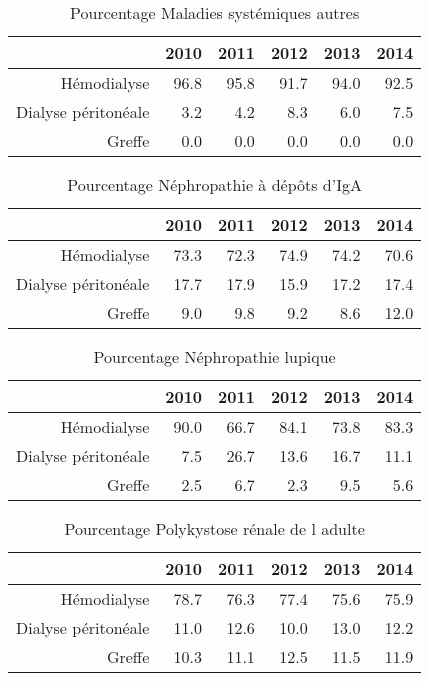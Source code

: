 \documentclass[11pt,a4paper]{article}\usepackage[]{graphicx}\usepackage[]{color}
\begin{document}
\begin{table}[H]
\centering
\begin{tabular}{rrrrrr}
  \hline
 & 2010 & 2011 & 2012 & 2013 & 2014 \\ 
  \hline
Hémodialyse & 96.8 & 95.8 & 91.7 & 94.0 & 92.5 \\ 
  Dialyse péritonéale & 3.2 & 4.2 & 8.3 & 6.0 & 7.5 \\ 
  Greffe & 0.0 & 0.0 & 0.0 & 0.0 & 0.0 \\ 
   \hline
\end{tabular}
\caption{Pourcentage Maladies systémiques autres} 
\end{table}
\begin{table}[H]
\centering
\begin{tabular}{rrrrrr}
  \hline
 & 2010 & 2011 & 2012 & 2013 & 2014 \\ 
  \hline
Hémodialyse & 73.3 & 72.3 & 74.9 & 74.2 & 70.6 \\ 
  Dialyse péritonéale & 17.7 & 17.9 & 15.9 & 17.2 & 17.4 \\ 
  Greffe & 9.0 & 9.8 & 9.2 & 8.6 & 12.0 \\ 
   \hline
\end{tabular}
\caption{Pourcentage Néphropathie à dépôts d'IgA} 
\end{table}
\begin{table}[H]
\centering
\begin{tabular}{rrrrrr}
  \hline
 & 2010 & 2011 & 2012 & 2013 & 2014 \\ 
  \hline
Hémodialyse & 90.0 & 66.7 & 84.1 & 73.8 & 83.3 \\ 
  Dialyse péritonéale & 7.5 & 26.7 & 13.6 & 16.7 & 11.1 \\ 
  Greffe & 2.5 & 6.7 & 2.3 & 9.5 & 5.6 \\ 
   \hline
\end{tabular}
\caption{Pourcentage Néphropathie lupique} 
\end{table}
\begin{table}[H]
\centering
\begin{tabular}{rrrrrr}
  \hline
 & 2010 & 2011 & 2012 & 2013 & 2014 \\ 
  \hline
Hémodialyse & 78.7 & 76.3 & 77.4 & 75.6 & 75.9 \\ 
  Dialyse péritonéale & 11.0 & 12.6 & 10.0 & 13.0 & 12.2 \\ 
  Greffe & 10.3 & 11.1 & 12.5 & 11.5 & 11.9 \\ 
   \hline
\end{tabular}
\caption{Pourcentage Polykystose rénale de l adulte} 
\end{table}
\end{document}
